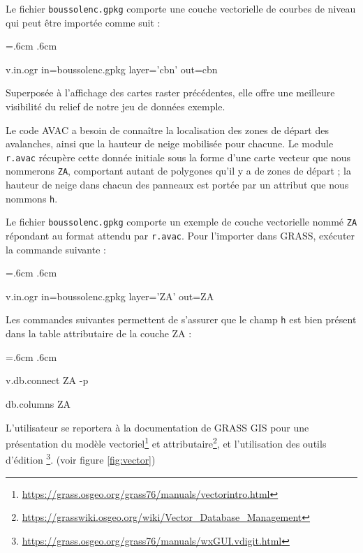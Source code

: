\documentclass[12pt,oneside]{paper}
\newenvironment{code}{%
\vspace{2mm}%
\hangindent=.6cm%
\parindent.6cm%
\ttfamily%
\color{gris.3}%
}{
\vspace{2mm}%
}
\begin{document}
Le fichier \texttt{boussolenc.gpkg} comporte une couche vectorielle de courbes de niveau qui peut être importée comme suit :

\begin{code}
v.in.ogr in=boussolenc.gpkg layer='cbn' out=cbn
\end{code}

Superposée à l'affichage des cartes raster précédentes, elle offre une meilleure visibilité du relief de notre jeu de données exemple.

Le code AVAC a besoin de connaître la localisation des zones de départ des avalanches, ainsi que la hauteur de neige mobilisée pour chacune. Le module \verb+r.avac+ récupère cette donnée initiale sous la forme d'une carte vecteur que nous nommerons \texttt{ZA}, comportant autant de polygones qu'il y a de zones de départ ; la hauteur de neige dans chacun des panneaux est portée par un attribut que nous nommons \texttt{h}.

Le fichier \texttt{boussolenc.gpkg} comporte un exemple de couche vectorielle nommé \texttt{ZA} répondant au format attendu par \verb+r.avac+. Pour l'importer dans GRASS, exécuter la commande suivante :

\begin{code}
v.in.ogr in=boussolenc.gpkg layer='ZA' out=ZA
\end{code}

Les commandes suivantes permettent de s'assurer que le champ \texttt{h} est bien présent dans la table attributaire de la couche ZA :

\begin{code}
v.db.connect ZA -p

db.columns ZA
\end{code}

L'utilisateur se reportera à la documentation de GRASS GIS pour une présentation du modèle vectoriel\footnote{\href{https://grass.osgeo.org/grass76/manuals/vectorintro.html}{https://grass.osgeo.org/grass76/manuals/vectorintro.html}} et attributaire\footnote{\href{https://grasswiki.osgeo.org/wiki/Vector\_Database\_Management}{https://grasswiki.osgeo.org/wiki/Vector\_Database\_Management}},  et l'utilisation des outils d'édition \footnote{\href{https://grass.osgeo.org/grass76/manuals/wxGUI.vdigit.html}{https://grass.osgeo.org/grass76/manuals/wxGUI.vdigit.html}}. (voir figure \ref{fig:vector})
\end{document}
